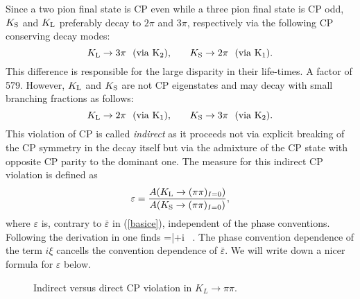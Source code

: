 Since a two pion final state is CP even while a three pion final state is CP
odd, $K_{\rm S}$ and $K_{\rm L}$ preferably decay to $2\pi$ and $3\pi$, 
respectively
via the following CP conserving decay modes:
\begin{equation}
K_{\rm L}\to 3\pi {\rm ~~(via~K_2),}\qquad K_{\rm S}\to 2 
\pi {\rm ~~(via~K_1).}
\end{equation}
This difference is responsible for the large disparity in their
life-times. A factor of 579.
However, $K_{\rm L}$ and $K_{\rm S}$ are not CP eigenstates and 
may decay with small branching fractions as follows:
\begin{equation}
K_{\rm L}\to 2\pi {\rm ~~(via~K_1),}\qquad K_{\rm S}\to 3 
\pi {\rm ~~(via~K_2).}
\end{equation}
This violation of CP is called {\it indirect} as it
proceeds not via explicit breaking of the CP symmetry in 
the decay itself but via the admixture of the CP state with opposite 
CP parity to the dominant one.
 The measure for this
indirect CP violation is defined as
\begin{equation}\label{ek}
\varepsilon
={{A(K_{\rm L}\rightarrow(\pi\pi)_{I=0}})\over{A(K_{\rm 
S}\rightarrow(\pi\pi)_{I=0})}},
\end{equation}
where $\varepsilon$ is, contrary to $\bar\varepsilon$ in (\ref{basice}),
independent of the phase conventions.
Following the derivation in \cite{CHAU83} one finds
\be\label{basic2}
\varepsilon=\bar\varepsilon+i \xi~.
\ee
The phase convention dependence of the term $i \xi$ cancells
the convention dependence of $\bar\varepsilon$. We will 
write down a nicer formula for $\varepsilon$ below.

\begin{figure}[hbt]
\centerline{
\epsfysize=1.5in
}
\caption[]{
Indirect versus direct CP violation in $K_L \to \pi\pi$.
\label{fig:14}}
\end{figure}


